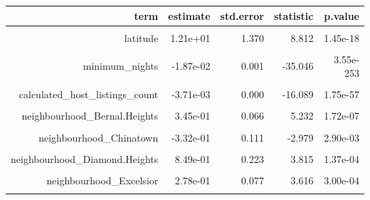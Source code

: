 \documentclass[justified, 11pt]{scrartcl}\usepackage[]{graphicx}\usepackage[]{xcolor}
\newenvironment{knitrout}{}{} %
\begin{document}
\begin{knitrout}
\begin{table}
\begin{tabular}{r|r|r|r|r}
\hline
term & estimate & std.error & statistic & p.value\\
\hline
\cellcolor{gray!6}{(Intercept)} & \cellcolor{gray!6}{4.01e+02} & \cellcolor{gray!6}{144.057} & \cellcolor{gray!6}{2.782} & \cellcolor{gray!6}{5.42e-03}\\
\hline
latitude & 1.21e+01 & 1.370 & 8.812 & 1.45e-18\\
\hline
\cellcolor{gray!6}{longitude} & \cellcolor{gray!6}{6.95e+00} & \cellcolor{gray!6}{1.017} & \cellcolor{gray!6}{6.833} & \cellcolor{gray!6}{8.81e-12}\\
\hline
minimum\_nights & -1.87e-02 & 0.001 & -35.046 & 3.55e-253\\
\hline
\cellcolor{gray!6}{number\_of\_reviews} & \cellcolor{gray!6}{-1.26e-03} & \cellcolor{gray!6}{0.000} & \cellcolor{gray!6}{-16.234} & \cellcolor{gray!6}{1.77e-58}\\
\hline
calculated\_host\_listings\_count & -3.71e-03 & 0.000 & -16.089 & 1.75e-57\\
\hline
\cellcolor{gray!6}{availability\_365} & \cellcolor{gray!6}{-9.99e-05} & \cellcolor{gray!6}{0.000} & \cellcolor{gray!6}{-1.904} & \cellcolor{gray!6}{5.69e-02}\\
\hline
neighbourhood\_Bernal.Heights & 3.45e-01 & 0.066 & 5.232 & 1.72e-07\\
\hline
\cellcolor{gray!6}{neighbourhood\_Castro.Upper.Market} & \cellcolor{gray!6}{5.02e-01} & \cellcolor{gray!6}{0.091} & \cellcolor{gray!6}{5.540} & \cellcolor{gray!6}{3.11e-08}\\
\hline
neighbourhood\_Chinatown & -3.32e-01 & 0.111 & -2.979 & 2.90e-03\\
\hline
\cellcolor{gray!6}{neighbourhood\_Crocker.Amazon} & \cellcolor{gray!6}{5.77e-01} & \cellcolor{gray!6}{0.099} & \cellcolor{gray!6}{5.809} & \cellcolor{gray!6}{6.48e-09}\\
\hline
neighbourhood\_Diamond.Heights & 8.49e-01 & 0.223 & 3.815 & 1.37e-04\\
\hline
\cellcolor{gray!6}{neighbourhood\_Downtown.Civic.Center} & \cellcolor{gray!6}{-1.78e-01} & \cellcolor{gray!6}{0.097} & \cellcolor{gray!6}{-1.823} & \cellcolor{gray!6}{6.84e-02}\\
\hline
neighbourhood\_Excelsior & 2.78e-01 & 0.077 & 3.616 & 3.00e-04\\
\hline
\cellcolor{gray!6}{neighbourhood\_Financial.District} & \cellcolor{gray!6}{7.43e-03} & \cellcolor{gray!6}{0.104} & \cellcolor{gray!6}{0.071} & \cellcolor{gray!6}{9.43e-01}\\

\end{tabular}
\end{table}
\end{knitrout}
\end{document}
